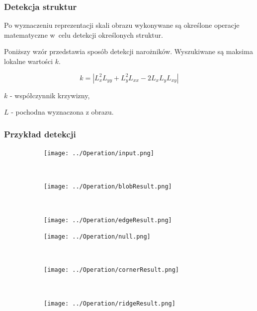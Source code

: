 \begin{frame}
	\frametitle{Detekcja struktur}

	Po wyznaczeniu reprezentacji skali obrazu wykonywane są określone operacje matematyczne w~celu detekcji określonych struktur.

	Poniższy wzór przedstawia sposób detekcji narożników. Wyszukiwane są maksima lokalne wartości $ k $.

	$$ k = |L_x^2L_{yy}  + L_y^2L_{xx} - 2L_xL_yL_{xy}| $$

	$ k $ - współczynnik krzywizny,

	$ L $ - pochodna wyznaczona z obrazu.



\end{frame}
\begin{frame}
	\frametitle{Przykład detekcji}

	\begin{figure}[h]
		\begin{center}

			\begin{subfigure}[b]{3cm}
				\centering
				\texttt{[image: ../Operation/input.png]}
			\end{subfigure}~
			\begin{subfigure}[b]{3cm}
				\centering
				\texttt{[image: ../Operation/blobResult.png]}
			\end{subfigure}~
			\begin{subfigure}[b]{3cm}
				\centering
				\texttt{[image: ../Operation/edgeResult.png]}
			\end{subfigure}

			\begin{subfigure}[b]{3cm}
				\centering
				\texttt{[image: ../Operation/null.png]}
			\end{subfigure}~
			\begin{subfigure}[b]{3cm}
				\centering
				\texttt{[image: ../Operation/cornerResult.png]}
			\end{subfigure}~
			\begin{subfigure}[b]{3cm}
				\centering
				\texttt{[image: ../Operation/ridgeResult.png]}
			\end{subfigure}
			\label{fig:wynik}
		\end{center}
	\end{figure}

\end{frame}
